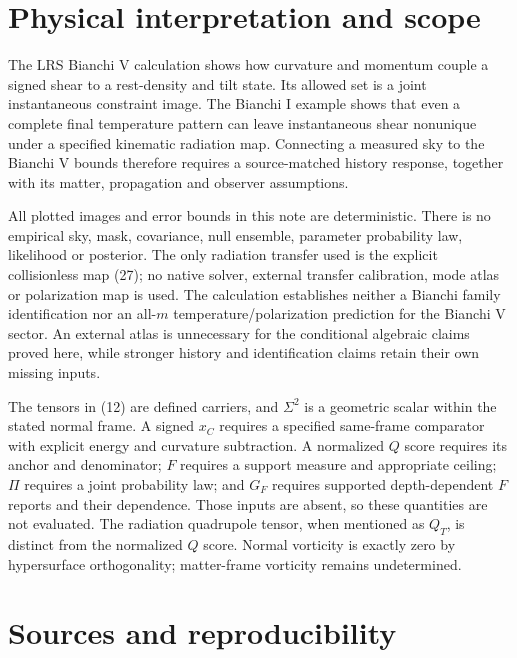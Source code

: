 \documentclass[aps,prd,reprint,onecolumn,nofootinbib]{revtex4-2}
\begin{document}
\hypertarget{physical-interpretation-and-scope}{%
\section{Physical interpretation and scope}\label{physical-interpretation-and-scope}}

The LRS Bianchi V calculation shows how curvature and momentum couple a signed shear to a rest-density and tilt state. Its allowed set is a joint instantaneous constraint image. The Bianchi I example shows that even a complete final temperature pattern can leave instantaneous shear nonunique under a specified kinematic radiation map. Connecting a measured sky to the Bianchi V bounds therefore requires a source-matched history response, together with its matter, propagation and observer assumptions.

All plotted images and error bounds in this note are deterministic. There is no empirical sky, mask, covariance, null ensemble, parameter probability law, likelihood or posterior. The only radiation transfer used is the explicit collisionless map (27); no native solver, external transfer calibration, mode atlas or polarization map is used. The calculation establishes neither a Bianchi family identification nor an all-\(m\) temperature/polarization prediction for the Bianchi V sector. An external atlas is unnecessary for the conditional algebraic claims proved here, while stronger history and identification claims retain their own missing inputs.

The tensors in (12) are defined carriers, and \(\Sigma^2\) is a geometric scalar within the stated normal frame. A signed \(x_C\) requires a specified same-frame comparator with explicit energy and curvature subtraction. A normalized \(Q\) score requires its anchor and denominator; \(F\) requires a support measure and appropriate ceiling; \(\Pi\) requires a joint probability law; and \(G_F\) requires supported depth-dependent \(F\) reports and their dependence. Those inputs are absent, so these quantities are not evaluated. The radiation quadrupole tensor, when mentioned as \(Q_T\), is distinct from the normalized \(Q\) score. Normal vorticity is exactly zero by hypersurface orthogonality; matter-frame vorticity remains undetermined.

\hypertarget{sources-and-reproducibility}{%
\section{Sources and reproducibility}\label{sources-and-reproducibility}}
\end{document}
